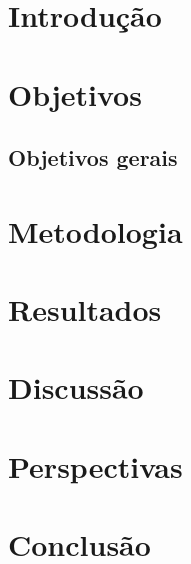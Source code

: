 \documentclass[
	12pt,				%
	oneside,
	a4paper,			%
	english,			%
	spanish,			%
	brazil				%
	]{abntex2}
\begin{document}
\chapter{Introdução}




\chapter{Objetivos}

\section{Objetivos gerais}



\chapter{Metodologia}



\chapter{Resultados}



\chapter{Discussão}



\chapter{Perspectivas}



\chapter{Conclusão}


\end{document}
